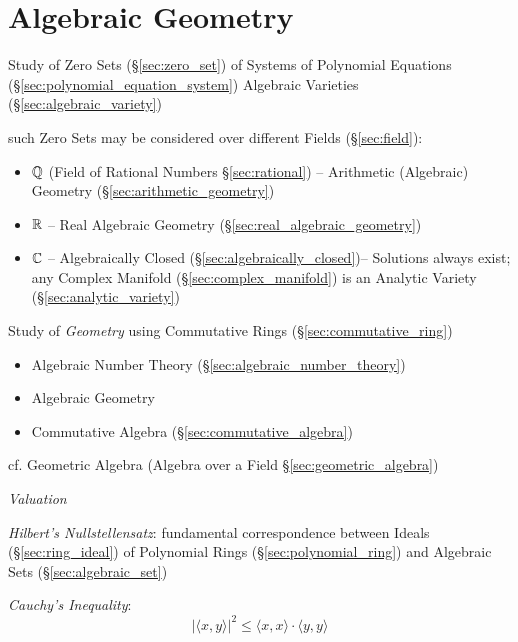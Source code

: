 \part{Algebraic Geometry}\label{part:algebraic_geometry}

Study of Zero Sets (\S\ref{sec:zero_set}) of Systems of Polynomial Equations
(\S\ref{sec:polynomial_equation_system}) \fist Algebraic Varieties
(\S\ref{sec:algebraic_variety})

such Zero Sets may be considered over different Fields (\S\ref{sec:field}):
\begin{itemize}
  \item $\mathbb{Q}$ (Field of Rational Numbers \S\ref{sec:rational}) --
    Arithmetic (Algebraic) Geometry (\S\ref{sec:arithmetic_geometry})
  \item $\mathbb{R}$ -- Real Algebraic Geometry
    (\S\ref{sec:real_algebraic_geometry})
  \item $\mathbb{C}$ -- Algebraically Closed (\S\ref{sec:algebraically_closed})--
    Solutions always exist; any Complex Manifold (\S\ref{sec:complex_manifold})
    is an Analytic Variety (\S\ref{sec:analytic_variety})
\end{itemize}

Study of \emph{Geometry} using Commutative Rings (\S\ref{sec:commutative_ring})

\begin{itemize}
  \item Algebraic Number Theory (\S\ref{sec:algebraic_number_theory})
  \item Algebraic Geometry
  \item Commutative Algebra (\S\ref{sec:commutative_algebra})
\end{itemize}

cf. Geometric Algebra (Algebra over a Field \S\ref{sec:geometric_algebra})

\emph{Valuation}

\emph{Hilbert's Nullstellensatz}: fundamental correspondence between Ideals
(\S\ref{sec:ring_ideal}) of Polynomial Rings (\S\ref{sec:polynomial_ring}) and
Algebraic Sets (\S\ref{sec:algebraic_set})

\emph{Cauchy's Inequality}:
\[
    |\langle x,y \rangle|^2 \leq \langle x,x \rangle \cdot \langle
    y,y \rangle
\]

